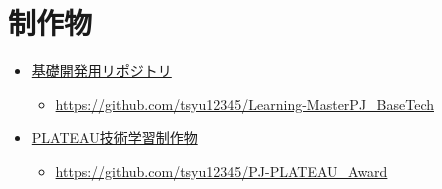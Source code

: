 \documentclass{article}[jsarticle]
\begin{document}
\appendix
\section{制作物}
\begin{itemize}
    \item \href{https://github.com/tsyu12345/Learning-MasterPJ_BaseTech}{基礎開発用リポジトリ}
    \begin{itemize}
        \item \url{https://github.com/tsyu12345/Learning-MasterPJ_BaseTech}
    \end{itemize}
    \item \href{https://github.com/tsyu12345/PJ-PLATEAU_Award}{PLATEAU技術学習制作物}
    \begin{itemize}
        \item \url{https://github.com/tsyu12345/PJ-PLATEAU_Award}
    \end{itemize}
\end{itemize}
\end{document}
